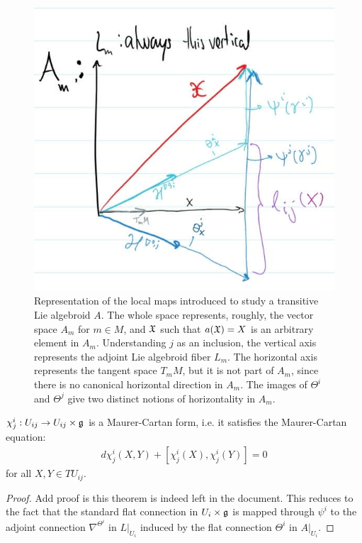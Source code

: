 \begin{figure}[t]
    \centering
    \includegraphics[width = \textwidth/2]{images/DiagramaMapasLocalesAlgebroide.jpg}
    \caption{Representation of the local maps introduced to study a transitive Lie algebroid $A$. The whole space represents, roughly, the vector space $A_m$ for $m \in M$, and $\mathfrak{X}$ such that $a(\mathfrak{X}) = X$ is an arbitrary element in $A_m$. Understanding $j$ as an inclusion, the vertical axis represents the adjoint Lie algebroid fiber $L_m$. The horizontal axis represents the tangent space $T_m M$, but it is not part of $A_m$, since there is no canonical horizontal direction in $A_m$. The images of $\Theta^i$ and $\Theta^j$ give two distinct notions of horizontality in $A_m$.}
    \label{fig:localMaps}
\end{figure}

\begin{theorem}
$\chi^i_j: U_{ij} \to U_{ij} \times \mathfrak{g}$ is a Maurer-Cartan form, i.e. it satisfies the Maurer-Cartan equation:
\begin{align*}
    d \chi^i_j(X, Y) + [\chi^i_j(X), \chi^i_j(Y)] = 0
\end{align*} for all $X, Y \in TU_{ij}$.
\end{theorem}

\begin{proof}
Add proof is this theorem is indeed left in the document. This reduces to the fact that the standard flat connection in $U_i \times \mathfrak{g}$ is mapped through $\psi^i$ to the adjoint connection $\nabla^{\Theta^i}$ in $L|_{U_i}$ induced by the flat connection $\Theta^i$ in $A|_{U_i}$. 
\end{proof}

